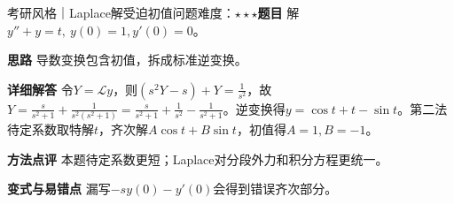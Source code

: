 \begin{example}{考研风格｜Laplace解受迫初值问题}{难度：$\star\star\star$}\label{deep:ex:integral_complex_deep:laplaceode}\textbf{题目} 解$y''+y=t,\ y(0)=1,y'(0)=0$。\par\textbf{思路} 导数变换包含初值，拆成标准逆变换。\par\textbf{详细解答} 令$Y=\mathcal Ly$，则$(s^2Y-s)+Y=\frac{1}{s^2}$，故$Y=\frac{s}{s^2+1}+\frac{1}{s^2(s^2+1)}=\frac{s}{s^2+1}+\frac{1}{s^2}-\frac{1}{s^2+1}$。逆变换得$y=\cos t+t-\sin t$。第二法待定系数取特解$t$，齐次解$A\cos t+B\sin t$，初值得$A=1,B=-1$。\par\textbf{方法点评} 本题待定系数更短；Laplace对分段外力和积分方程更统一。\par\textbf{变式与易错点} 漏写$-sy(0)-y'(0)$会得到错误齐次部分。\end{example}
